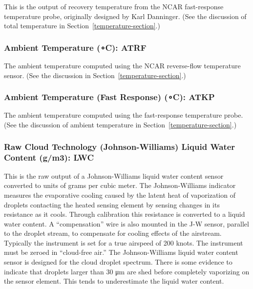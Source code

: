 \documentclass[
  english,
]{book}
\begin{document}
This is the output of recovery temperature from the NCAR fast-response temperature probe, originally designed by Karl Danninger. (See the discussion of total temperature in Section~\ref{temperature-section}.)

\hypertarget{atrf}{%
\subsubsection*{\texorpdfstring{Ambient Temperature ({∘C}): ATRF}{Ambient Temperature (∘C): ATRF}}\label{atrf}}

The ambient temperature computed using the NCAR reverse-flow temperature sensor. (See the discussion in Section~\ref{temperature-section}.)

\hypertarget{atkp}{%
\subsubsection*{\texorpdfstring{Ambient Temperature (Fast Response) ({∘C}): ATKP}{Ambient Temperature (Fast Response) (∘C): ATKP}}\label{atkp}}

The ambient temperature computed using the fast-response temperature probe. (See the discussion of ambient temperature in Section~\ref{temperature-section}.)

\hypertarget{jwlwc}{%
\subsubsection*{\texorpdfstring{Raw Cloud Technology (Johnson-Williams) Liquid Water Content ({g/m3}): LWC}{Raw Cloud Technology (Johnson-Williams) Liquid Water Content (g/m3): LWC}}\label{jwlwc}}

This is the raw output of a Johnson-Williams liquid water content sensor converted to units of grams per cubic meter. The Johnson-Williams indicator measures the evaporative cooling caused by the latent heat of vaporization of droplets contacting the heated sensing element by sensing changes in its resistance as it cools. Through calibration this resistance is converted to a liquid water content. A ``compensation'' wire is also mounted in the J-W sensor, parallel to the droplet stream, to compensate for cooling effects of the airstream. Typically the instrument is set for a true airspeed of 200 knots. The instrument must be zeroed in ``cloud-free air.'' The Johnson-Williams liquid water content sensor is designed for the cloud droplet spectrum. There is some evidence to indicate that droplets larger than 30 {μm} are shed before completely vaporizing on the sensor element. This tends to underestimate the liquid water content.
\end{document}
